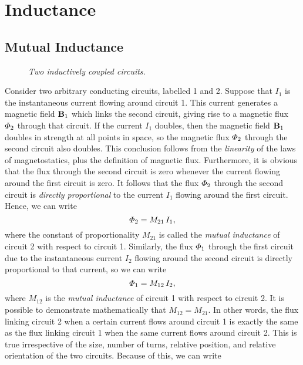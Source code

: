 \section{Inductance}
\subsection{Mutual Inductance}
\begin{figure}[h]
\epsfysize=3in
\centerline{}
\caption{\em Two inductively coupled circuits.}\label{f10.1}
\end{figure}
Consider two arbitrary conducting circuits, labelled 1 and 2. Suppose
that $I_1$ is the instantaneous current flowing around circuit 1. This current
generates a magnetic field ${\bf B}_1$ which links the second circuit, giving
rise to a magnetic flux ${\mit\Phi}_{2}$ through that circuit. 
If the current $I_1$ doubles, then the magnetic field ${\bf B}_1$ doubles
in strength at all points in space, so the magnetic flux ${\mit\Phi}_{2}$
through the second circuit also doubles. This conclusion follows from the
{\em linearity}\/ of the laws of magnetostatics, plus the definition of
magnetic flux. Furthermore, it is  obvious that the flux  through the
second circuit is zero whenever the current  flowing around the first circuit
is zero. It follows that the flux ${\mit\Phi}_{2}$ through the second
circuit is {\em directly proportional}\/ to the current $I_1$ flowing around the
first circuit. Hence, we can write
\begin{equation}\label{e10.1}
 {\mit\Phi}_{2} = M_{21}\,I_1,
\end{equation}
where the constant of proportionality $M_{21}$ is called the {\em mutual
inductance}\/ of circuit 2 with respect to circuit 1. Similarly, the flux
${\mit\Phi}_{1}$ through the first circuit due to the instantaneous
current $I_2$ flowing around the second circuit is directly proportional to
that current, so we can write
\begin{equation}\label{e10.2}
 {\mit\Phi}_{1} = M_{12}\,I_2,
\end{equation}
where $M_{12}$ is the {\em mutual
inductance} of circuit 1 with respect to circuit 2. It is possible to demonstrate
mathematically that $M_{12}= M_{21}$. In other words, the flux linking
circuit 2 when a certain current flows around circuit 1 is exactly the same
as the flux linking circuit 1 when the same current flows around circuit
2. This is true irrespective of the size, number of turns,
relative position, and relative
orientation of the two circuits. Because of this, we can write
